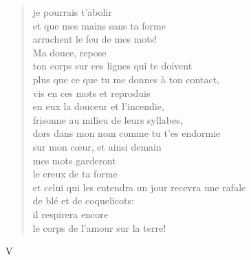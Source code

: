 \documentclass[11pt,a4paper]{book}
\begin{document}
\begin{verse}
je pourrais t'abolir \\
et que mes mains sans ta forme \\
arrachent le feu de mes mots! \\
Ma douce, repose \\
ton corps sur ces lignes qui te doivent \\
plus que ce que tu me donnes à ton contact, \\
vis en ces mots et reproduis \\
en eux la douceur et l'incendie, \\
frisonne au milieu de leurs syllabes, \\
dors dans mon nom comme tu t'es endormie \\
sur mon c{\oe}ur, et ainsi demain \\
mes mots garderont \\
le creux de ta forme \\
et celui qui les entendra un jour recevra une rafale \\
de blé et de coquelicots: \\
il respirera encore \\
le corps de l'amour sur la terre!
\end{verse}

\newpage

{\huge V} \\ \\
\end{document}
